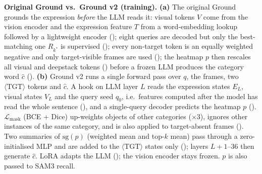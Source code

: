 \caption{\textbf{Original Ground vs.\ Ground v2 (training).}
\textbf{(a)} The original Ground grounds the expression \emph{before} the LLM reads it:
visual tokens $V$ come from the vision encoder and the expression feature $T$ from a word-embedding
lookup followed by a lightweight encoder (); eight queries are decoded but only the best-matching
one $R_{k^*}$ is supervised (); every non-target token is an equally weighted negative and only
target-visible frames are used (); the heatmap $p$ then rescales all visual and deepstack tokens
() before a frozen LLM produces the category word $\hat{c}$ ().
\textbf{(b)} Ground v2 runs a single forward pass over $q$, the frames, two $\langle\mathrm{TGT}\rangle$ tokens and $\hat{c}$.
A hook on LLM layer $L$ reads the expression states $E_L$, visual states $V_L$ and the query seed $q_0$,
i.e.\ features computed after the model has read the whole sentence (), and a single-query decoder
predicts the heatmap $p$ (). $\mathcal{L}_{\mathrm{mask}}$ (BCE + Dice) up-weights objects of other categories
($\times3$), ignores other instances of the same category, and is also applied to target-absent frames ().
Two summaries of $\mathrm{sg}(p)$ (weighted mean and top-$k$ mean) pass through a zero-initialised MLP and are
added to the $\langle\mathrm{TGT}\rangle$ states only (); layers $L{+}1$--$36$ then generate $\hat{c}$.
LoRA adapts the LLM (); the vision encoder stays frozen. $p$ is also passed to SAM3 recall.}
